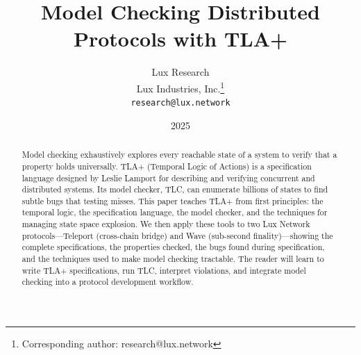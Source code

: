 \documentclass[11pt,a4paper]{article}
\title{Model Checking Distributed Protocols with TLA+}
\author{
Lux Research \\
Lux Industries, Inc.\thanks{Corresponding author: research@lux.network}\\
\texttt{research@lux.network}
}
\date{2025}
\begin{document}
\luxcoverpage

\begin{abstract}
Model checking exhaustively explores every reachable state of a system to verify that a
property holds universally. TLA+ (Temporal Logic of Actions) is a specification language
designed by Leslie Lamport for describing and verifying concurrent and distributed systems.
Its model checker, TLC, can enumerate billions of states to find subtle bugs that testing
misses. This paper teaches TLA+ from first principles: the temporal logic, the specification
language, the model checker, and the techniques for managing state space explosion. We then
apply these tools to two Lux Network protocols---Teleport (cross-chain bridge) and Wave
(sub-second finality)---showing the complete specifications, the properties checked, the
bugs found during specification, and the techniques used to make model checking tractable.
The reader will learn to write TLA+ specifications, run TLC, interpret violations, and
integrate model checking into a protocol development workflow.
\end{abstract}

\tableofcontents
\newpage











\end{document}
